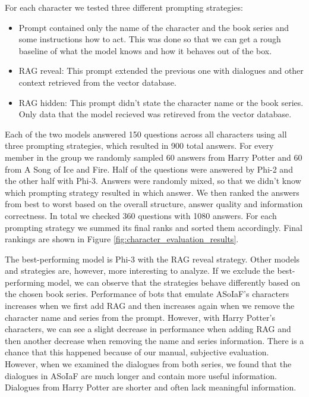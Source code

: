 \documentclass[fleqn,moreauthors,10pt]{ds_report}
\begin{document}
For each character we tested three different prompting strategies:
\begin{itemize}
	\item Prompt contained only the name of the character and the book series and some instructions how to act. This was done so that we can get a rough baseline of what the model knows and how it behaves out of the box.
	\item RAG reveal: This prompt extended the previous one with dialogues and other context retrieved from the vector database.
	\item RAG hidden: This prompt didn't state the character name or the book series. Only data that the model recieved was retireved from the vector database.
\end{itemize}

Each of the two models answered 150 questions across all characters using all three prompting strategies, which resulted in 900 total answers.
For every member in the group we randomly sampled 60 answers from Harry Potter and 60 from A Song of Ice and Fire.
Half of the questions were answered by Phi-2 and the other half with Phi-3.
Answers were randomly mixed, so that we didn't know which prompting strategy resulted in which answer.
We then ranked the answers from best to worst based on the overall structure, answer quality and information correctness.
In total we checked 360 questions with 1080 answers.
For each prompting strategy we summed its final ranks and sorted them accordingly.
Final rankings are shown in Figure \ref*{fig:character_evaluation_results}.

The best-performing model is Phi-3 with the RAG reveal strategy.
Other models and strategies are, however, more interesting to analyze.
If we exclude the best-performing model, we can observe that the strategies behave differently based on the chosen book series.
Performance of bots that emulate ASoIaF's characters increases when we first add RAG and then increases again when we remove the character name and series from the prompt.
However, with Harry Potter's characters, we can see a slight decrease in performance when adding RAG and then another decrease when removing the name and series information.
There is a chance that this happened because of our manual, subjective evaluation.
However, when we examined the dialogues from both series, we found that the dialogues in ASoIaF are much longer and contain more useful information.
Dialogues from Harry Potter are shorter and often lack meaningful information.
\end{document}
